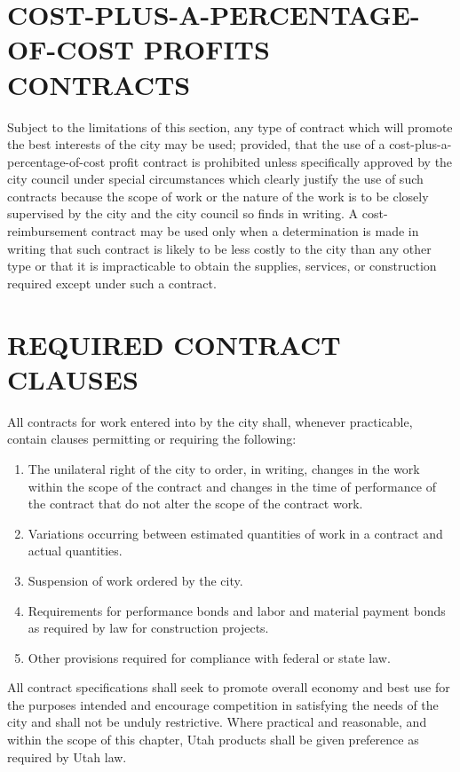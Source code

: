 \section{COST-PLUS-A-PERCENTAGE-OF-COST PROFITS CONTRACTS}
Subject to the limitations of this section, any type of contract which will promote the best interests of the city may be used; provided, that the use of a cost-plus-a-percentage-of-cost profit contract is prohibited unless specifically approved by the city council under special circumstances which clearly justify the use of such contracts because the scope of work or the nature of the work is to be closely supervised by the city and the city council so finds in writing. A cost-reimbursement contract may be used only when a determination is made in writing that such contract is likely to be less costly to the city than any other type or that it is impracticable to obtain the supplies, services, or construction required except under such a contract. 

\section{REQUIRED CONTRACT CLAUSES}
All contracts for work entered into by the city shall, whenever practicable, contain clauses permitting or requiring the following: 

\begin{enumerate}
	\item The unilateral right of the city to order, in writing, changes in the work within the scope of the contract and changes in the time of performance of the contract that do not alter the scope of the contract work. 
	\item Variations occurring between estimated quantities of work in a contract and actual quantities. 
	\item Suspension of work ordered by the city. 
	\item Requirements for performance bonds and labor and material payment bonds as required by law for construction projects. 
	\item Other provisions required for compliance with federal or state law. 
\end{enumerate}

All contract specifications shall seek to promote overall economy and best use for the purposes intended and encourage competition in satisfying the needs of the city and shall not be unduly restrictive. Where practical and reasonable, and within the scope of this chapter, Utah products shall be given preference as required by Utah law. 

